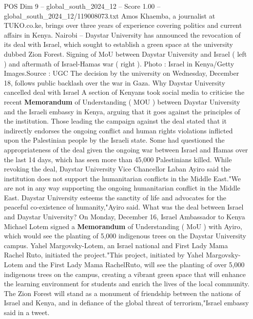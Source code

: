 \begin{textsample}{POS Dim 9 – global\_south\_2024\_12 – Score 1.00 – global\_south\_2024\_12/119008073.txt}  \label{ex:f9_pos_231}
Amos Khaemba, a journalist at TUKO.co.ke, brings over three years of experience covering politics and current affairs in Kenya.
Nairobi -- Daystar University has announced the revocation of its deal with Israel, which sought to establish a green space at the university dubbed Zion Forest.
Signing of MoU between Daystar University and Israel ( left ) and aftermath of Israel-Hamas war ( right ).
Photo : Israel in Kenya/Getty Images.Source : UGC The decision by the university on Wednesday, December 18, follows public backlash over the war in Gaza.
Why Daystar University cancelled deal with Israel A section of Kenyans took social media to criticise the recent \textbf{Memorandum} of Understanding ( MOU ) between Daystar University and the Israeli embassy in Kenya, arguing that it goes against the principles of the institution.
Those leading the campaign against the deal stated that it indirectly endorses the ongoing conflict and human rights violations inflicted upon the Palestinian people by the Israeli state.
Some had questioned the appropriateness of the deal given the ongoing war between Israel and Hamas over the last 14 days, which has seen more than 45,000 Palestinians killed.
While revoking the deal, Daystar University Vice Chancellor Laban Ayiro said the institution does not support the humanitarian conflicts in the Middle East."We are not in any way supporting the ongoing humanitarian conflict in the Middle East.
Daystar University esteems the sanctity of life and advocates for the peaceful co-existence of humanity,"Ayiro said.
What was the deal between Israel and Daystar University?
On Monday, December 16, Israel Ambassador to Kenya Michael Lotem signed a \textbf{Memorandum} of Understanding ( MoU ) with Ayiro, which would see the planting of 5,000 indigenous trees on the Daystar University campus.
Yahel Margovsky-Lotem, an Israel national and First Lady Mama Rachel Ruto, initiated the project."This project, initiated by Yahel Margovsky-Lotem and the First Lady Mama RachelRuto, will see the planting of over 5,000 indigenous trees on the campus, creating a vibrant green space that will enhance the learning environment for students and enrich the lives of the local community.
The Zion Forest will stand as a monument of friendship between the nations of Israel and Kenya, and in defiance of the global threat of terrorism,"Israel embassy said in a tweet.

\end{textsample}

